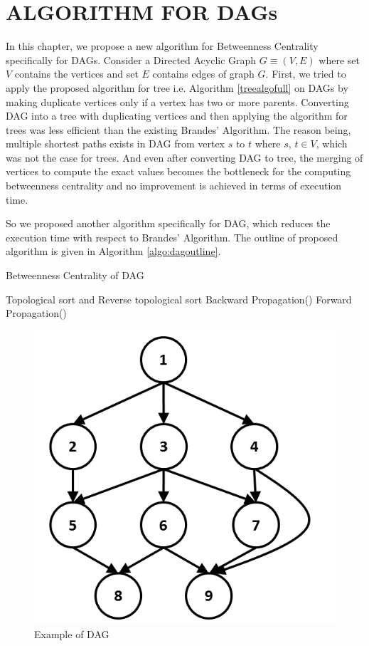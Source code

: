 \chapter{ALGORITHM FOR DAGs}
\label{chap:sup}
 
In this chapter, we propose a new algorithm for Betweenness Centrality specifically for DAGs. 
Consider a Directed Acyclic Graph $G \equiv (V,E)$ where set $V$ contains the vertices and set $E$ contains edges of graph $G$. 
First, we tried to apply the proposed algorithm for tree i.e. Algorithm \ref{treealgofull} on DAGs by making duplicate vertices only if a vertex has two or more parents. Converting DAG into a tree with duplicating vertices and then applying the algorithm for trees was less efficient than the existing Brandes' Algorithm. The reason being, multiple shortest paths exists in DAG from vertex $s$ to $t$ where $s$,  $t \in V$, which was not the case for trees. And even after converting DAG to tree, the merging of vertices to compute the exact values becomes the bottleneck for the computing betweenness centrality and no improvement is achieved in terms of execution time.   

So we proposed another algorithm specifically for DAG, which reduces the execution time with respect to Brandes' Algorithm. The outline of proposed algorithm is given in Algorithm \ref{algo:dagoutline}.
\vspace{1em}
\begin{algorithm}

\caption{Betweenness Centrality of DAG}
\label{algo:dagoutline}
Topological sort and Reverse topological sort\;
Backward Propagation()\;
Forward Propagation()\;
\end{algorithm}

\begin{figure}
\centering
\includegraphics[scale=0.9]{images/Slide3.PNG}
\caption{Example of DAG}
\label{fig:exdag}
\end{figure}


